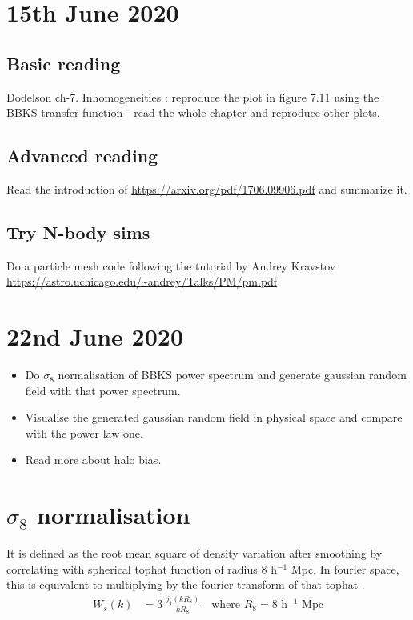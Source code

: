 \documentclass[12pt]{article}
\begin{document}
	



\section{15th June 2020}

\subsection{Basic reading}
Dodelson ch-7. Inhomogeneities : reproduce the plot in figure 7.11 using the BBKS transfer function - read the whole chapter and reproduce other plots.

\subsection{Advanced reading}
Read the introduction of \url{https://arxiv.org/pdf/1706.09906.pdf} and summarize it.

\subsection{Try N-body sims}
Do a particle mesh code following the tutorial by Andrey Kravstov \url{https://astro.uchicago.edu/~andrey/Talks/PM/pm.pdf} 


\section{22nd June 2020}

\begin{itemize}
\item Do $\sigma_8$ normalisation of BBKS power spectrum and generate gaussian random field with that power spectrum.
\item  Visualise the generated gaussian random field in physical space and compare with the power law one.
\item Read more about halo bias.
\end{itemize}
 

\newpage

\newpage

\section{$\sigma_8$ normalisation}
It is defined as the root mean square of density variation after smoothing by correlating with spherical tophat function of radius 8 h$^{-1}$ Mpc. In fourier space, this is equivalent to multiplying by the fourier transform of that tophat .
\begin{align}
W_s(k) &= 3 ~\frac{j_1(k R_8)}{k R_8} \quad \text{where } R_8 = 8 \text{ h$^{-1}$ Mpc}
\end{align}
\end{document}
